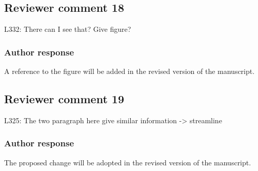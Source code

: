 \documentclass[11pt]{scrartcl}
\begin{document}
\subsection*{Reviewer comment 18}
L332: There can I see that? Give figure?

\subsubsection*{Author response}

A reference to the figure will be added in the revised version of the
manuscript.

\subsection*{Reviewer comment 19}
L325: The two paragraph here give similar information -> streamline

\subsubsection*{Author response}

The proposed change will be adopted in the revised version of the manuscript.

%
%
%
\end{document}
